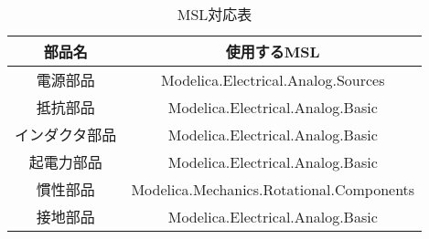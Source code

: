 \begin{table}[t]
	\centering
	\caption{MSL対応表}
	\begin{tabular}{|c|c|} \hline
	  部品名 & 使用するMSL \\ \hline \hline
	  電源部品 & Modelica.Electrical.Analog.Sources \\ \hline
	  抵抗部品 & Modelica.Electrical.Analog.Basic \\ \hline
	  インダクタ部品 & Modelica.Electrical.Analog.Basic \\ \hline
	  起電力部品 & Modelica.Electrical.Analog.Basic \\ \hline
	  慣性部品 & Modelica.Mechanics.Rotational.Components \\ \hline
	  接地部品 & Modelica.Electrical.Analog.Basic \\ \hline
	\end{tabular}
	\label{tab:MSL}
  \end{table}


  
% 	





